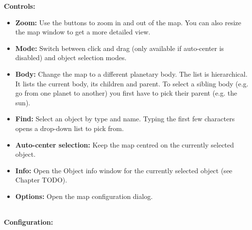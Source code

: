 \documentclass[Orbiter User Manual.tex]{subfiles}
\begin{document}
\begin{figure}[H]
	\centering
\end{figure}

\noindent
\textbf{Controls:}

\begin{itemize}
\item \textbf{Zoom:} Use the buttons to zoom in and out of the map. You can also resize the map window to get a more detailed view.
\item \textbf{Mode:} Switch between click and drag (only available if auto-center is disabled) and object selection modes.
\item \textbf{Body:} Change the map to a different planetary body. The list is hierarchical. It lists the current body, its children and parent. To select a sibling body (e.g. go from one planet to another) you first have to pick their parent (e.g. the sun).
\item \textbf{Find:} Select an object by type and name. Typing the first few characters opens a drop-down list to pick from.
\item \textbf{Auto-center selection:} Keep the map centred on the currently selected object.
\item \textbf{Info:} Open the Object info window for the currently selected object (see Chapter TODO).
\item \textbf{Options:} Open the map configuration dialog.
\end{itemize}

\noindent
\\
\textbf{Configuration:}

\begin{figure}[H]
	\centering
\end{figure}
\end{document}
